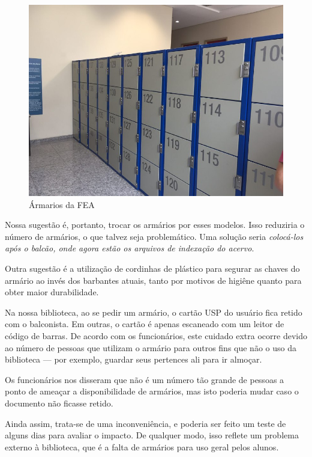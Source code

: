 \documentclass[titlepage]{article}
\begin{document}
\begin{figure}[ht!]
\caption{Ármarios da FEA}
\label{fig:armario}
\centering
\includegraphics[width=1\textwidth]{armario}
\end{figure}

Nossa sugestão é, portanto, trocar os armários por esses modelos. Isso 
reduziria o número de armários, o que talvez seja problemático. Uma solução 
seria \emph{colocá-los após o balcão, onde agora estão os arquivos de indexação 
do acervo}.

Outra sugestão é a utilização de cordinhas de plástico para segurar as chaves 
do armário ao invés dos barbantes atuais, tanto por motivos de higiêne quanto
para obter maior durabilidade.

Na nossa biblioteca, ao se pedir um armário, o cartão USP do usuário fica retido
com o balconista. Em outras, o cartão é apenas escaneado com um leitor de código
de barras. De acordo com os funcionários, este cuidado extra ocorre devido ao 
número de pessoas que utilizam o armário para outros fins que não o uso da 
biblioteca --- por exemplo, guardar seus pertences ali para ir almoçar. 

Os funcionários nos disseram que não é um número tão grande de pessoas a ponto 
de ameaçar a disponibilidade de armários, mas isto poderia mudar caso o 
documento não ficasse retido.

Ainda assim, trata-se de uma inconveniência, e poderia ser feito um teste de 
alguns dias para avaliar o impacto. De qualquer modo, isso reflete um problema
externo à biblioteca, que é a falta de armários para uso geral pelos alunos. 
\end{document}
